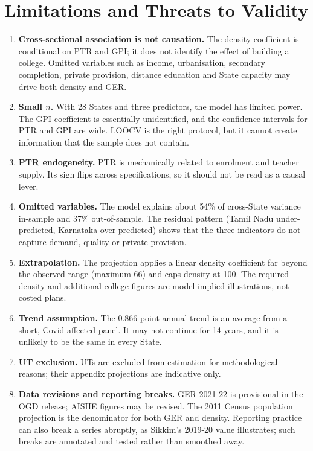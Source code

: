 \section{Limitations and Threats to Validity}\label{sec:limitations}

\begin{enumerate}
  \item \textbf{Cross-sectional association is not causation.} The density coefficient is conditional on PTR and GPI; it does not identify the effect of building a college. Omitted variables such as income, urbanisation, secondary completion, private provision, distance education and State capacity may drive both density and GER.
  \item \textbf{Small \(n\).} With 28 States and three predictors, the model has limited power. The GPI coefficient is essentially unidentified, and the confidence intervals for PTR and GPI are wide. LOOCV is the right protocol, but it cannot create information that the sample does not contain.
  \item \textbf{PTR endogeneity.} PTR is mechanically related to enrolment and teacher supply. Its sign flips across specifications, so it should not be read as a causal lever.
  \item \textbf{Omitted variables.} The model explains about 54\% of cross-State variance in-sample and 37\% out-of-sample. The residual pattern (Tamil Nadu under-predicted, Karnataka over-predicted) shows that the three indicators do not capture demand, quality or private provision.
  \item \textbf{Extrapolation.} The projection applies a linear density coefficient far beyond the observed range (maximum 66) and caps density at 100. The required-density and additional-college figures are model-implied illustrations, not costed plans.
  \item \textbf{Trend assumption.} The 0.866-point annual trend is an average from a short, Covid-affected panel. It may not continue for 14 years, and it is unlikely to be the same in every State.
  \item \textbf{UT exclusion.} UTs are excluded from estimation for methodological reasons; their appendix projections are indicative only.
  \item \textbf{Data revisions and reporting breaks.} GER 2021-22 is provisional in the OGD release; AISHE figures may be revised. The 2011 Census population projection is the denominator for both GER and density. Reporting practice can also break a series abruptly, as Sikkim's 2019-20 value illustrates; such breaks are annotated and tested rather than smoothed away.

\end{enumerate}
